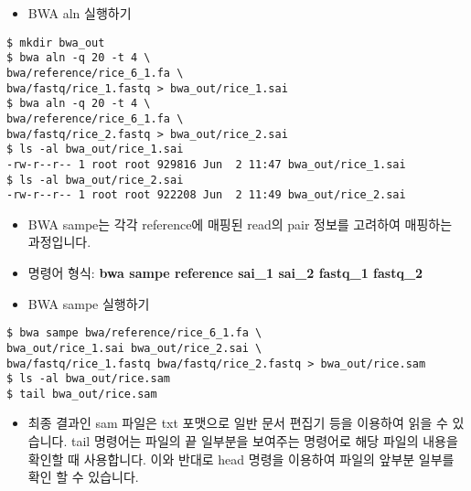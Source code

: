 \documentclass{article}
\begin{document}
\begin{itemize}
\item
  \begin{itemize}
  BWA aln 실행하기  
  \end{itemize}
\end{itemize}
\begin{lstlisting}[frame=single,style=Bash,xleftmargin=1.4cm,xrightmargin=1.4cm]
$ mkdir bwa_out
$ bwa aln -q 20 -t 4 \ 
bwa/reference/rice_6_1.fa \
bwa/fastq/rice_1.fastq > bwa_out/rice_1.sai
$ bwa aln -q 20 -t 4 \
bwa/reference/rice_6_1.fa \
bwa/fastq/rice_2.fastq > bwa_out/rice_2.sai
$ ls -al bwa_out/rice_1.sai 
-rw-r--r-- 1 root root 929816 Jun  2 11:47 bwa_out/rice_1.sai
$ ls -al bwa_out/rice_2.sai 
-rw-r--r-- 1 root root 922208 Jun  2 11:49 bwa_out/rice_2.sai
\end{lstlisting}

\begin{itemize}
\item
  \begin{itemize}
   BWA sampe는 각각 reference에 매핑된 read의 pair 정보를 고려하여 매핑하는 과정입니다.
  \end{itemize}
\end{itemize}
\begin{itemize}
\item
  \begin{itemize}
   명령어 형식: \textbf{bwa sampe reference sai\_1 sai\_2 fastq\_1 fastq\_2}
  \end{itemize}
\end{itemize}

\begin{itemize}
\item
  \begin{itemize}
  BWA sampe 실행하기  
  \end{itemize}
\end{itemize}
\begin{lstlisting}[frame=single,style=Bash,xleftmargin=1.4cm,xrightmargin=1.4cm]
$ bwa sampe bwa/reference/rice_6_1.fa \
bwa_out/rice_1.sai bwa_out/rice_2.sai \
bwa/fastq/rice_1.fastq bwa/fastq/rice_2.fastq > bwa_out/rice.sam
$ ls -al bwa_out/rice.sam 
$ tail bwa_out/rice.sam 
\end{lstlisting}

\begin{itemize}
\item
  \begin{itemize}
   최종 결과인 sam 파일은 txt 포맷으로 일반 문서 편집기 등을 이용하여 읽을 수 있습니다. tail 명령어는 파일의 끝 일부분을 보여주는 명령어로 해당 파일의 내용을 확인할 때 사용합니다. 이와 반대로 head 명령을 이용하여 파일의 앞부분 일부를 확인 할 수 있습니다.
  \end{itemize}
\end{itemize}
\end{document}
